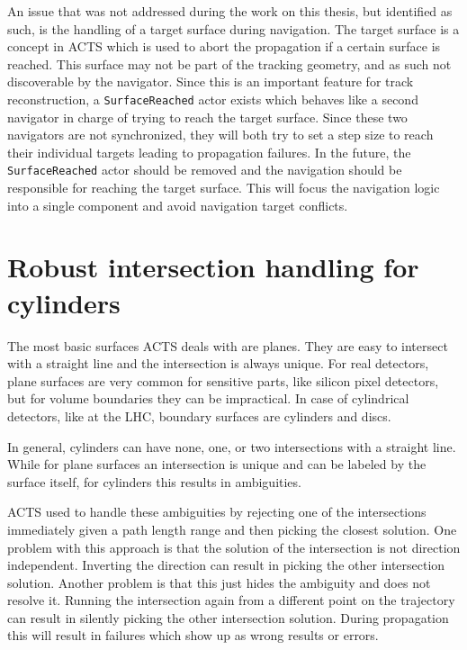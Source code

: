 An issue that was not addressed during the work on this thesis, but identified as such, is the handling of a target surface during navigation. The target surface is a concept in ACTS which is used to abort the propagation if a certain surface is reached. This surface may not be part of the tracking geometry, and as such not discoverable by the navigator. Since this is an important feature for track reconstruction, a \texttt{SurfaceReached} actor exists which behaves like a second navigator in charge of trying to reach the target surface. Since these two navigators are not synchronized, they will both try to set a step size to reach their individual targets leading to propagation failures. In the future, the \texttt{SurfaceReached} actor should be removed and the navigation should be responsible for reaching the target surface. This will focus the navigation logic into a single component and avoid navigation target conflicts.

\section{Robust intersection handling for cylinders}

The most basic surfaces ACTS deals with are planes. They are easy to intersect with a straight line and the intersection is always unique. For real detectors, plane surfaces are very common for sensitive parts, like silicon pixel detectors, but for volume boundaries they can be impractical. In case of cylindrical detectors, like at the LHC, boundary surfaces are cylinders and discs.

In general, cylinders can have none, one, or two intersections with a straight line. While for plane surfaces an intersection is unique and can be labeled by the surface itself, for cylinders this results in ambiguities.

ACTS used to handle these ambiguities by rejecting one of the intersections immediately given a path length range and then picking the closest solution. One problem with this approach is that the solution of the intersection is not direction independent. Inverting the direction can result in picking the other intersection solution. Another problem is that this just hides the ambiguity and does not resolve it. Running the intersection again from a different point on the trajectory can result in silently picking the other intersection solution. During propagation this will result in failures which show up as wrong results or errors.

